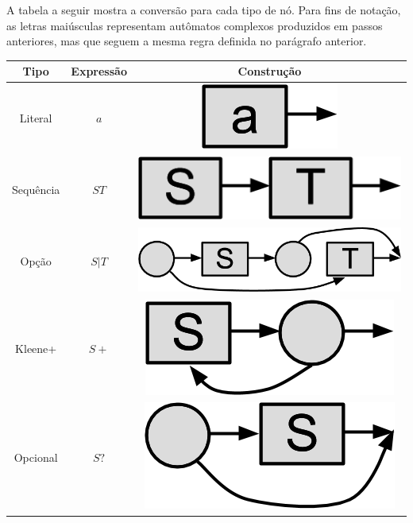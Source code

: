 \documentclass[a4paper,12pt,oneside,onecolumn]{uerj}
\begin{document}
A tabela a seguir mostra a conversão para cada tipo de nó. Para fins de notação, as letras maiúsculas representam autômatos complexos produzidos em passos anteriores, mas que seguem a mesma regra definida no parágrafo anterior.

\begin{center}
	\begin{tabular}{ c | c | c }
		{\bf Tipo} & {\bf Expressão} & {\bf Construção} \\
		\hline
		\hline
		Literal & $a$ & \includegraphics[scale=0.25]{figures/thompson_literal.png} \\ 
		\hline
		Sequência & $ST$ & \includegraphics[scale=0.25]{figures/thompson_sequence.png} \\ 
		\hline
		Opção & $S|T$ & \includegraphics[scale=0.25]{figures/thompson_option.png} \\ 
		\hline
		Kleene+ & $S+$ & \includegraphics[scale=0.25]{figures/thompson_plus.png} \\ 
		\hline
		Opcional & $S?$ & \includegraphics[scale=0.25]{figures/thompson_question.png} \\ 

\end{tabular}
\end{center}
\end{document}
